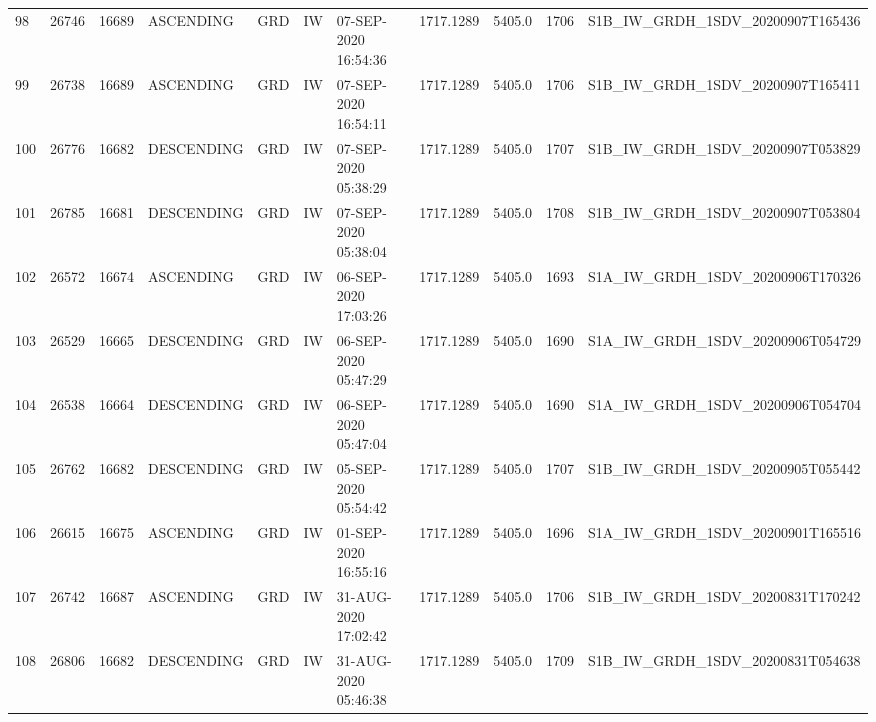 \begin{tabular}{lrrllllllll}
98  &  26746 &   16689 &   ASCENDING &          GRD &              IW &  07-SEP-2020 16:54:36 &                  1717.1289 &          5405.0 &       1706 &  S1B\_IW\_GRDH\_1SDV\_20200907T165436 \\
99  &  26738 &   16689 &   ASCENDING &          GRD &              IW &  07-SEP-2020 16:54:11 &                  1717.1289 &          5405.0 &       1706 &  S1B\_IW\_GRDH\_1SDV\_20200907T165411 \\
100 &  26776 &   16682 &  DESCENDING &          GRD &              IW &  07-SEP-2020 05:38:29 &                  1717.1289 &          5405.0 &       1707 &  S1B\_IW\_GRDH\_1SDV\_20200907T053829 \\
101 &  26785 &   16681 &  DESCENDING &          GRD &              IW &  07-SEP-2020 05:38:04 &                  1717.1289 &          5405.0 &       1708 &  S1B\_IW\_GRDH\_1SDV\_20200907T053804 \\
102 &  26572 &   16674 &   ASCENDING &          GRD &              IW &  06-SEP-2020 17:03:26 &                  1717.1289 &          5405.0 &       1693 &  S1A\_IW\_GRDH\_1SDV\_20200906T170326 \\
103 &  26529 &   16665 &  DESCENDING &          GRD &              IW &  06-SEP-2020 05:47:29 &                  1717.1289 &          5405.0 &       1690 &  S1A\_IW\_GRDH\_1SDV\_20200906T054729 \\
104 &  26538 &   16664 &  DESCENDING &          GRD &              IW &  06-SEP-2020 05:47:04 &                  1717.1289 &          5405.0 &       1690 &  S1A\_IW\_GRDH\_1SDV\_20200906T054704 \\
105 &  26762 &   16682 &  DESCENDING &          GRD &              IW &  05-SEP-2020 05:54:42 &                  1717.1289 &          5405.0 &       1707 &  S1B\_IW\_GRDH\_1SDV\_20200905T055442 \\
106 &  26615 &   16675 &   ASCENDING &          GRD &              IW &  01-SEP-2020 16:55:16 &                  1717.1289 &          5405.0 &       1696 &  S1A\_IW\_GRDH\_1SDV\_20200901T165516 \\
107 &  26742 &   16687 &   ASCENDING &          GRD &              IW &  31-AUG-2020 17:02:42 &                  1717.1289 &          5405.0 &       1706 &  S1B\_IW\_GRDH\_1SDV\_20200831T170242 \\
108 &  26806 &   16682 &  DESCENDING &          GRD &              IW &  31-AUG-2020 05:46:38 &                  1717.1289 &          5405.0 &       1709 &  S1B\_IW\_GRDH\_1SDV\_20200831T054638 \\

\end{tabular}
